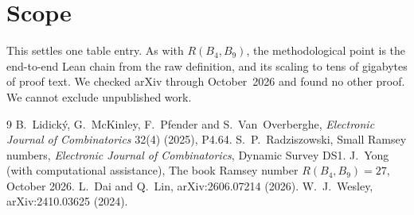\documentclass[11pt]{amsart}
\theoremstyle{definition}
\begin{document}
\section{Scope}

This settles one table entry. As with $R(B_4,B_9)$, the methodological
point is the end-to-end Lean chain from the raw definition, and its
scaling to tens of gigabytes of proof text. We checked arXiv through
October~2026 and found no other proof. We cannot exclude unpublished
work.

\begin{thebibliography}{9}
 B.~Lidick\'y, G.~McKinley, F.~Pfender and
S.~Van~Overberghe, \emph{Electronic Journal of Combinatorics} 32(4)
(2025), P4.64.
 S.~P.~Radziszowski, Small Ramsey numbers,
\emph{Electronic Journal of Combinatorics}, Dynamic Survey DS1.
 J.~Yong (with computational assistance), The book
Ramsey number $R(B_4,B_9)=27$, October 2026.
 L.~Dai and Q.~Lin, arXiv:2606.07214 (2026).
 W.~J.~Wesley, arXiv:2410.03625 (2024).
\end{thebibliography}
\end{document}
